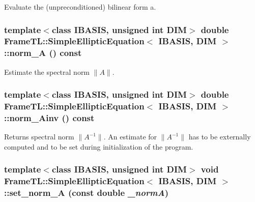 Evaluate the (unpreconditioned) bilinear form a. \hypertarget{classFrameTL_1_1SimpleEllipticEquation_6d728f871244c8cb079e58eaca8c2402}{
\subsubsection[norm\_\-A]{\setlength{\rightskip}{0pt plus 5cm}template$<$class IBASIS, unsigned int DIM$>$ double {\bf FrameTL::SimpleEllipticEquation}$<$ IBASIS, DIM $>$::norm\_\-A () const}}
\label{classFrameTL_1_1SimpleEllipticEquation_6d728f871244c8cb079e58eaca8c2402}


Estimate the spectral norm $\|A\|$. \hypertarget{classFrameTL_1_1SimpleEllipticEquation_4c74106d2957712ae44948082f2a92d5}{
\subsubsection[norm\_\-Ainv]{\setlength{\rightskip}{0pt plus 5cm}template$<$class IBASIS, unsigned int DIM$>$ double {\bf FrameTL::SimpleEllipticEquation}$<$ IBASIS, DIM $>$::norm\_\-Ainv () const}}
\label{classFrameTL_1_1SimpleEllipticEquation_4c74106d2957712ae44948082f2a92d5}


Returns spectral norm $\|A^{-1}\|$. An estimate for $\|A^{-1}\|$ has to be externally computed and to be set during initialization of the program. \hypertarget{classFrameTL_1_1SimpleEllipticEquation_2c56b637a942bd4543e7cbf6cd885244}{
\subsubsection[set\_\-norm\_\-A]{\setlength{\rightskip}{0pt plus 5cm}template$<$class IBASIS, unsigned int DIM$>$ void {\bf FrameTL::SimpleEllipticEquation}$<$ IBASIS, DIM $>$::set\_\-norm\_\-A (const double {\em \_\-normA})}}
\label{classFrameTL_1_1SimpleEllipticEquation_2c56b637a942bd4543e7cbf6cd885244}


